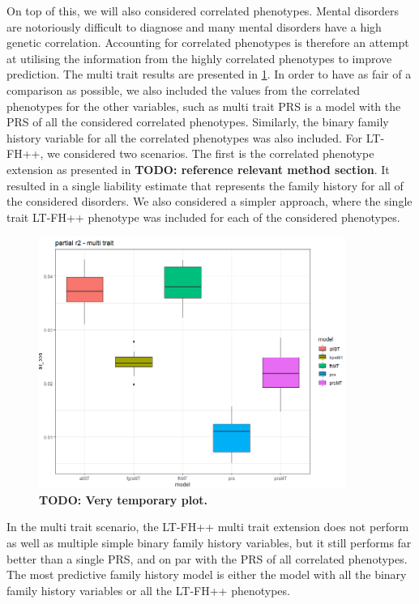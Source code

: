 On top of this, we will also considered correlated phenotypes. Mental disorders are notoriously difficult to diagnose and many mental disorders have a high genetic correlation. Accounting for correlated phenotypes is therefore an attempt at utilising the information from the highly correlated phenotypes to improve prediction. The multi trait results are presented in \cref{fig:paper3:predictionResultsMultiTrait}. In order to have as fair of a comparison as possible, we also included the values from the correlated phenotypes for the other variables, such as multi trait PRS is a model with the PRS of all the considered correlated phenotypes. Similarly, the binary family history variable for all the correlated phenotypes was also included. For LT-FH++, we considered two scenarios. The first is the correlated phenotype extension as presented in \textbf{TODO: reference relevant method section}. It resulted in a single liability estimate that represents the family history for all of the considered disorders. We also considered a simpler approach, where the single trait LT-FH++ phenotype was included for each of the considered phenotypes.

\begin{figure}
	\includegraphics[width=10cm]{results/adhd_predictive_power_multitrait.png}
	\caption[Out of sample multi trait prediction performance]{\textbf{TODO: Very temporary plot.}}
	\label{fig:paper3:predictionResultsMultiTrait}
\end{figure}


In the multi trait scenario, the LT-FH++ multi trait extension does not perform as well as multiple simple binary family history variables, but it still performs far better than a single PRS, and on par with the PRS of all correlated phenotypes. The most predictive family history model is either the model with all the binary family history variables or all the LT-FH++ phenotypes.


